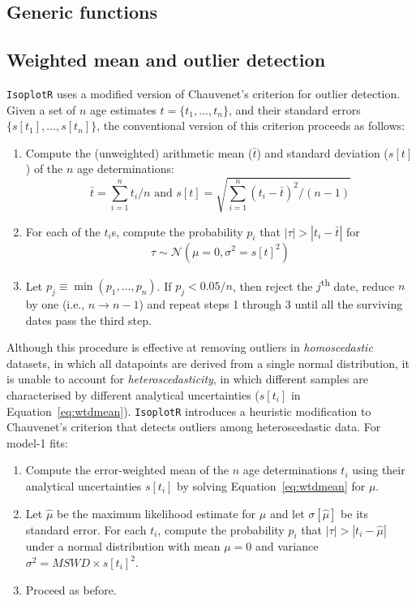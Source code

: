 \begin{refsection}
\chapter{Generic functions}\label{ch:generic}

\section{Weighted mean and outlier detection}
\label{sec:weightedmean}

\texttt{IsoplotR} uses a modified version of Chauvenet's criterion for
outlier detection. Given a set of $n$ age estimates $t = \{t_1, ...,
t_n\}$, and their standard errors $\{s[t_1], ..., s[t_n]\}$, the
conventional version of this criterion proceeds as follows:

\begin{enumerate}
\item Compute the (unweighted) arithmetic mean ($\bar{t}$) and
  standard deviation ($s[t]$) of the $n$ age determinations:
  \[
  \bar{t} = \sum_{i=1}^{n} t_i/n \mbox{~and~}
  s[t] = \sqrt{\sum_{i=1}^{n} (t_i-\bar{t})^2/(n-1)}
  \]

\item For each of the $t_i$s, compute the probability $p_i$ that
  $|\tau|>|t_i-\bar{t}|$ for
  \[
  \tau \sim \mathcal{N}(\mu=0,\sigma^2=s[t]^2)
  \]
  
\item Let $p_j \equiv \min(p_1,...,p_n)$. If $p_j<0.05/n$, then reject
  the $j$\textsuperscript{th} date, reduce $n$ by one (i.e., $n
  \rightarrow n-1$) and repeat steps 1 through 3 until all the
  surviving dates pass the third step.

\end{enumerate}

Although this procedure is effective at removing outliers in
\emph{homoscedastic} datasets, in which all datapoints are derived
from a single normal distribution, it is unable to account for
\emph{heteroscedasticity}, in which different samples are
characterised by different analytical uncertainties ($s[t_i]$ in
Equation~\ref{eq:wtdmean}). \texttt{IsoplotR} introduces a heuristic
modification to Chauvenet's criterion that detects outliers among
heteroscedastic data. For model-1 fits:

\begin{enumerate}
\item Compute the error-weighted mean of the $n$ age determinations
  $t_i$ using their analytical uncertainties $s[t_i]$ by solving
  Equation~\ref{eq:wtdmean} for $\mu$.
\item Let $\hat{\mu}$ be the maximum likelihood estimate for $\mu$ and
  let $\sigma[\hat{\mu}]$ be its standard error. For each $t_i$,
  compute the probability $p_i$ that $|\tau|>|t_i-\hat{\mu}|$ under a
  normal distribution with mean $\mu=0$ and variance $\sigma^2 = MSWD
  \times s[t_i]^2$.
\item Proceed as before.
\end{enumerate}


\end{refsection}
